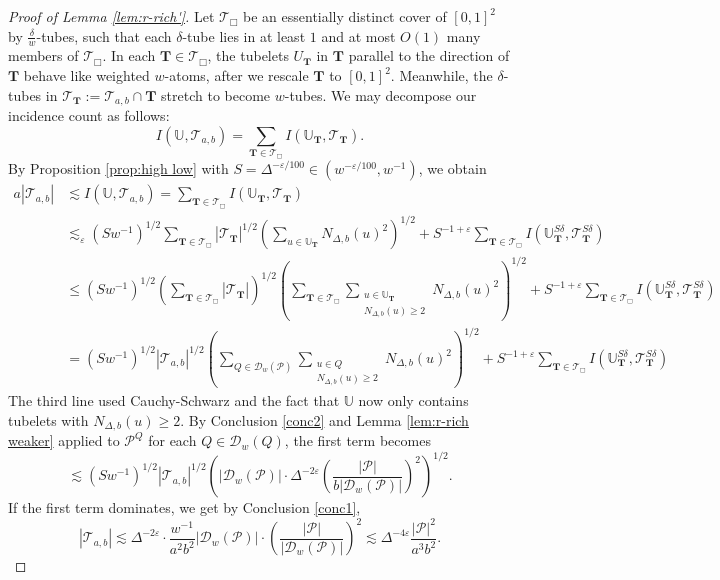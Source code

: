 \documentclass{amsart}
\newcommand{\N}{\mathbb{N}}
\newcommand{\T}{\mathcal{T}}
\newcommand{\U}{\mathbb{U}}
\newcommand{\eps}{\varepsilon}
\newcommand{\lesim}{\lesssim}
\newcommand{\bT}{\mathbf{T}}
\newcommand{\cD}{\mathcal{D}}
\newcommand{\cT}{\mathcal{T}}
\newcommand{\cP}{\mathcal{P}}
\begin{document}
\begin{proof}[Proof of Lemma \ref{lem:r-rich'}]
    Let $\T_{\Box}$ be an essentially distinct cover of $[0, 1]^2$ by $\frac{\delta}{w}$-tubes, such that each $\delta$-tube lies in at least $1$ and at most $O(1)$ many members of $\T_{\Box}$. In each $\bT \in \T_{\Box}$, the tubelets $U_{\bT}$ in $\bT$ parallel to the direction of $\bT$ behave like weighted $w$-atoms, after we rescale $\bT$ to $[0, 1]^2$. Meanwhile, the $\delta$-tubes in $\T_{\bT} := \cT_{a,b}\cap \bT$ stretch to become $w$-tubes. We may decompose our incidence count as follows:
    \begin{equation*}
        I(\U, \T_{a,b}) = \sum_{\bT \in \T_{\Box}} I(\U_{\bT}, \T_{\bT}).
    \end{equation*}
    By Proposition \ref{prop:high low}  with $S = \Delta^{-\eps/100} \in (w^{-\eps/100}, w^{-1})$, we obtain
    \begin{align*}
        a |\T_{a,b}|& \lesim I(\U, \T_{a,b}) = \sum_{\bT \in \T_{\Box}} I(\U_{\bT}, \T_{\bT}) \\
                &\lesim_\eps (Sw^{-1})^{1/2} \sum_{\bT \in \T_{\Box}} |\T_{\bT}|^{1/2} \left( \sum_{u \in \U_{\bT}} N_{\Delta, b} (u)^2 \right)^{1/2} + S^{-1+\eps} \sum_{\bT \in \T_{\Box}} I(\U_\bT^{S\delta}, \T_\bT^{S\delta}) \\
                &\le (Sw^{-1})^{1/2} \left( \sum_{\bT \in \T_{\Box}} |\T_{\bT}| \right)^{1/2} \left( \sum_{\bT \in \T_{\Box}} \sum_{\substack{u \in \U_{\bT}\\N_{\Delta,b} (u) \ge 2}} N_{\Delta, b} (u)^2 \right)^{1/2} + S^{-1+\eps} \sum_{\bT \in \T_{\Box}} I(\U_\bT^{S\delta}, \T_\bT^{S\delta}) \\
                &= (Sw^{-1})^{1/2} |\T_{a,b}|^{1/2} \left( \sum_{Q \in \cD_w (\cP)} \sum_{\substack{u \in Q\\N_{\Delta, b} (u) \ge 2}} N_{\Delta,b} (u)^2 \right)^{1/2} + S^{-1+\eps} \sum_{\bT \in \T_{\Box}} I(\U_\bT^{S\delta}, \T_\bT^{S\delta})
    \end{align*}
    The third line used Cauchy-Schwarz and the fact that $\U$ now only contains tubelets with $N_{\Delta,b} (u) \ge 2$. By Conclusion \ref{conc2} and Lemma \ref{lem:r-rich weaker} applied to $\cP^Q$ for each $Q \in \cD_w (Q)$, the first term becomes
    $$\lesim (Sw^{-1})^{1/2} |\T_{a,b}|^{1/2} \left( |\cD_w (\cP)| \cdot \Delta^{-2\eps} \left( \frac{|\cP|}{b|\cD_w (\cP)|} \right)^2 \right)^{1/2}.$$
    If the first term dominates, we get by Conclusion \ref{conc1},
    \begin{equation*}
        |\T_{a,b}| \lesim \Delta^{-2\eps} \cdot \frac{w^{-1}}{a^2 b^2} |\cD_w (\cP)| \cdot \left( \frac{|\cP|}{|\cD_w (\cP)|} \right)^2 \lesim \Delta^{-4\eps} \frac{|\cP|^2}{a^3 b^2}.
    \end{equation*}


\end{proof}
\end{document}
